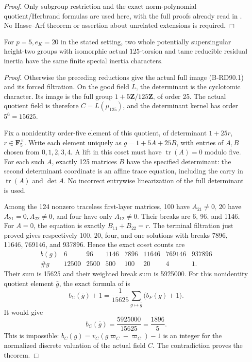\begin{proof}
Only subgroup restriction and the exact norm-polynomial
quotient/Herbrand formulas are used here, with the full proofs
already read in \cite[Propositions 3.7--3.10, pp.~14--16]
{ColmezCorpsLocaux}. No Hasse--Arf theorem or assertion about
unrelated extensions is required.
\end{proof}

\begin{theorem}
\label{thm:B-RD90-tame-exclusion}
For \(p=5,e_K=20\) in the stated setting, two whole potentially
supersingular height-two groups with isomorphic actual
\(125\)-torsion and tame reducible residual inertia have the
same finite special inertia characters.
\end{theorem}
\begin{proof}
Otherwise the preceding reductions give the actual full image
(B-RD90.1) and its forced filtration. On the good field \(L\),
the determinant is the cyclotomic character. Its image is the
full group \(1+5\mathbf Z/125\mathbf Z\), of order 25.
The actual quotient field is therefore \(C=L(\mu_{125})\),
and the determinant kernel has order \(5^6=15625\).

Fix a nonidentity order-five element of this quotient, of
determinant \(1+25r\), \(r\in\mathbf F_5^\times\).
Write each element uniquely as \(g=1+5A+25B\), with entries
of \(A,B\) chosen from \(0,1,2,3,4\). A lift in this coset
must have \(\operatorname{tr}(A)=0\) modulo five. For each
such \(A\), exactly 125 matrices \(B\) have the specified
determinant: the second determinant coordinate is an affine
trace equation, including the carry in \(\operatorname{tr}(A)\)
and \(\det A\). No incorrect entrywise linearization of
the full determinant is used.

Among the 124 nonzero traceless first-layer matrices,
100 have \(A_{21}\ne0\), 20 have \(A_{21}=0,A_{22}\ne0\),
and four have only \(A_{12}\ne0\). Their breaks are
6, 96, and 1146. For \(A=0\), the equation is exactly
\(B_{11}+B_{22}=r\). The terminal filtration just proved
gives respectively 100, 20, four, and one solutions with
breaks 7896, 11646, 769146, and 937896. Hence the exact
coset counts are
\[
\begin{array}{c|rrrrrrr}
 b(g)&6&96&1146&7896&11646&769146&937896\\\hline
 \#g&12500&2500&500&100&20&4&1.
\end{array}                                                   \tag{B-RD90.14}
\]
Their sum is 15625 and their weighted break sum is 5925000.
For this nonidentity quotient element \(\bar g\), the exact
formula of \cite[Proposition 3.7 and full proof]{ColmezCorpsLocaux}
is
\[
 b_C(\bar g)+1
   =\frac{1}{15625}\sum_{g\mapsto\bar g}\bigl(b_F(g)+1\bigr).
\]
It would give
\[
                  b_C(\bar g)=\frac{5925000}{15625}
                              =\frac{1896}{5}.        \tag{B-RD90.15}
\]
This is impossible: \(b_C(\bar g)=v_C(\bar g\varpi_C-\varpi_C)-1\)
is an integer for the normalized discrete valuation of the
actual field \(C\). The contradiction proves the theorem.
\end{proof}

